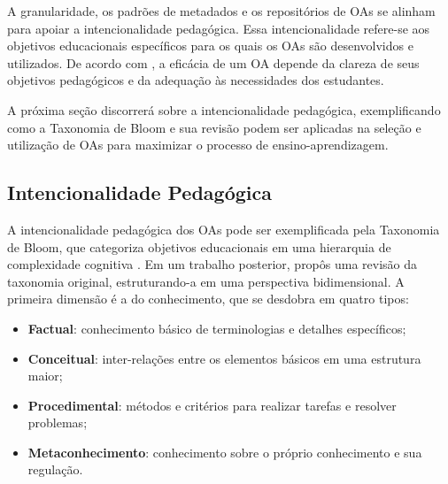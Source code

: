 
A granularidade, os padrões de metadados e os repositórios de OAs se alinham para apoiar a intencionalidade pedagógica. Essa intencionalidade refere-se aos objetivos educacionais específicos para os quais os OAs são desenvolvidos e utilizados. De acordo com , a eficácia de um OA depende da clareza de seus objetivos pedagógicos e da adequação às necessidades dos estudantes.

A próxima seção discorrerá sobre a intencionalidade pedagógica, exemplificando como a Taxonomia de Bloom e sua revisão podem ser aplicadas na seleção e utilização de OAs para maximizar o processo de ensino-aprendizagem.

\subsection{Intencionalidade Pedagógica}

A intencionalidade pedagógica dos OAs pode ser exemplificada pela Taxonomia de Bloom, que categoriza objetivos educacionais em uma hierarquia de complexidade cognitiva \cite{Bloom1984}. Em um trabalho posterior,  propôs uma revisão da taxonomia original, estruturando-a em uma perspectiva bidimensional. A primeira dimensão é a do conhecimento, que se desdobra em quatro tipos:

\begin{itemize}
    \item \textbf{Factual}: conhecimento básico de terminologias e detalhes específicos;
    \item \textbf{Conceitual}: inter-relações entre os elementos básicos em uma estrutura maior;
    \item \textbf{Procedimental}: métodos e critérios para realizar tarefas e resolver problemas;
    \item \textbf{Metaconhecimento}: conhecimento sobre o próprio conhecimento e sua regulação.
\end{itemize}

